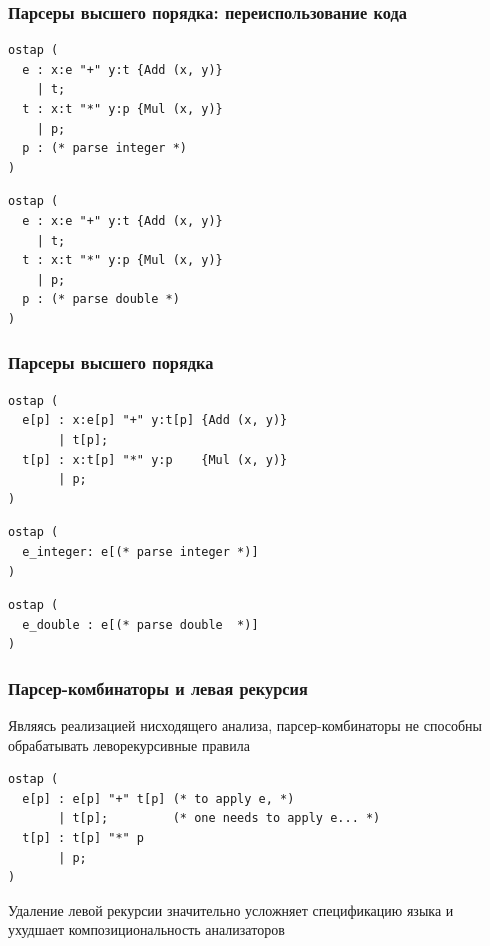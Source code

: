 \documentclass{beamer}
\begin{document}
\begin{frame}[fragile]
  \transwipe[direction=90]
  \frametitle{Парсеры высшего порядка: переиспользование кода}  
\begin{lstlisting}[frame=single]  
ostap (
  e : x:e "+" y:t {Add (x, y)} 
    | t; 
  t : x:t "*" y:p {Mul (x, y)} 
    | p;
  p : (* parse integer *)
)
\end{lstlisting}
  
\begin{lstlisting}[frame=single]  
ostap (
  e : x:e "+" y:t {Add (x, y)} 
    | t; 
  t : x:t "*" y:p {Mul (x, y)} 
    | p;
  p : (* parse double *)
)
\end{lstlisting}	  
  
\end{frame}


\begin{frame}[fragile]
  \transwipe[direction=90]
  \frametitle{Парсеры высшего порядка}  
\begin{lstlisting}[frame=single]  
ostap (
  e[p] : x:e[p] "+" y:t[p] {Add (x, y)} 
       | t[p]; 
  t[p] : x:t[p] "*" y:p    {Mul (x, y)} 
       | p;
)
\end{lstlisting}
  
\begin{lstlisting}[frame=single]  
ostap (
  e_integer: e[(* parse integer *)]
)
\end{lstlisting}
  
\begin{lstlisting}[frame=single] 
ostap (
  e_double : e[(* parse double  *)]
)
\end{lstlisting}
\end{frame}


\begin{frame}[fragile]
  \transwipe[direction=90]
  \frametitle{Парсер-комбинаторы и левая рекурсия}  
Являясь реализацией нисходящего анализа, парсер-комбинаторы не способны обрабатывать леворекурсивные правила

\begin{lstlisting}[frame=single]  
ostap (
  e[p] : e[p] "+" t[p] (* to apply e, *)
       | t[p];         (* one needs to apply e... *)
  t[p] : t[p] "*" p    
       | p;
)
\end{lstlisting}

Удаление левой рекурсии значительно усложняет спецификацию языка и ухудшает композициональность анализаторов
\end{frame}
\end{document}
